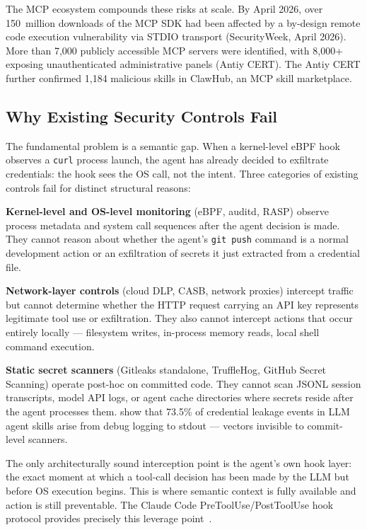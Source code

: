 \documentclass[11pt,letterpaper]{article}
\begin{document}
The MCP ecosystem compounds these risks at scale. By April 2026, over 150~million
downloads of the MCP SDK had been affected by a by-design remote code execution
vulnerability via STDIO transport (SecurityWeek, April 2026). More than 7,000 publicly
accessible MCP servers were identified, with 8,000+ exposing unauthenticated
administrative panels (Antiy CERT). The Antiy CERT further confirmed 1,184 malicious
skills in ClawHub, an MCP skill marketplace.

\subsection{Why Existing Security Controls Fail}

The fundamental problem is a semantic gap. When a kernel-level eBPF hook observes a
\texttt{curl} process launch, the agent has already decided to exfiltrate credentials:
the hook sees the OS call, not the intent. Three categories of existing controls fail
for distinct structural reasons:

\textbf{Kernel-level and OS-level monitoring} (eBPF, auditd, RASP) observe process
metadata and system call sequences after the agent decision is made. They cannot reason
about whether the agent's \texttt{git push} command is a normal development action or
an exfiltration of secrets it just extracted from a credential file.

\textbf{Network-layer controls} (cloud DLP, CASB, network proxies) intercept traffic
but cannot determine whether the HTTP request carrying an API key represents legitimate
tool use or exfiltration. They also cannot intercept actions that occur entirely locally
--- filesystem writes, in-process memory reads, local shell command execution.

\textbf{Static secret scanners} (Gitleaks standalone, TruffleHog, GitHub Secret Scanning)
operate post-hoc on committed code. They cannot scan JSONL session transcripts, model
API logs, or agent cache directories where secrets reside after the agent processes them.
\citet{chen2026credential} show that 73.5\% of credential leakage events in LLM agent
skills arise from debug logging to stdout --- vectors invisible to commit-level scanners.

The only architecturally sound interception point is the agent's own hook layer: the
exact moment at which a tool-call decision has been made by the LLM but before OS
execution begins. This is where semantic context is fully available and action is still
preventable. The Claude Code PreToolUse/PostToolUse hook protocol provides precisely
this leverage point~\citep{zhao2026clawguard,wang2026agentspec}.
\end{document}
